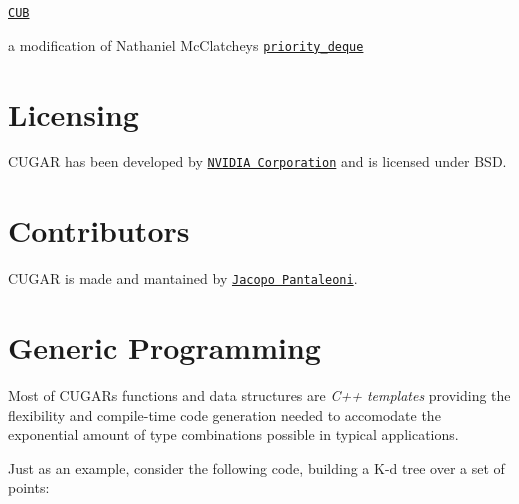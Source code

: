 \begin{DoxyItemize}
\item \href{http://nvlabs.github.io/cub/}{\tt C\+UB}
\item a modification of Nathaniel Mc\+Clatchey\textquotesingle{}s \href{https://github.com/nmcclatchey/Priority-Deque/}{\tt priority\+\_\+deque}
\end{DoxyItemize}\hypertarget{index_Licensing}{}\section{Licensing}\label{index_Licensing}
\begin{DoxyParagraph}{}
C\+U\+G\+AR has been developed by \href{www.nvidia.com}{\tt N\+V\+I\+D\+IA Corporation} and is licensed under B\+SD.
\end{DoxyParagraph}
\hypertarget{index_Contributors}{}\section{Contributors}\label{index_Contributors}
\begin{DoxyParagraph}{}
C\+U\+G\+AR is made and mantained by \href{jpantaleoni@nvidia.com}{\tt Jacopo Pantaleoni}.
\end{DoxyParagraph}
 \hypertarget{generic_programming_page}{}\section{Generic Programming}\label{generic_programming_page}
\begin{DoxyParagraph}{}
Most of C\+U\+G\+AR\textquotesingle{}s functions and data structures are {\itshape C++ templates} providing the flexibility and compile-\/time code generation needed to accomodate the exponential amount of type combinations possible in typical applications. 
\end{DoxyParagraph}
\begin{DoxyParagraph}{}
Just as an example, consider the following code, building a K-\/d tree over a set of points\+: 
\end{DoxyParagraph}
